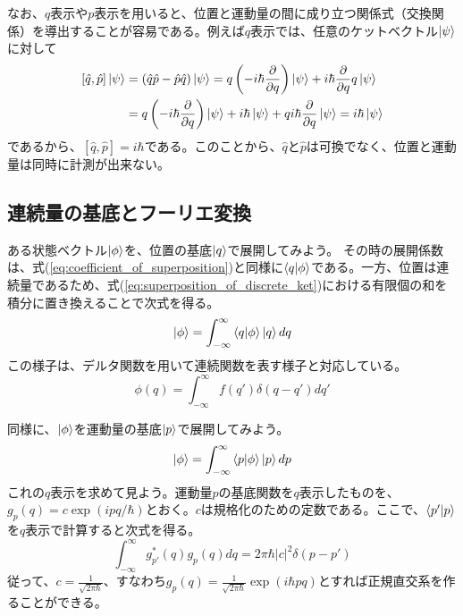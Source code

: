 なお、$q$表示や$p$表示を用いると、位置と運動量の間に成り立つ関係式（交換関係）を導出することが容易である。例えば$q$表示では、任意のケットベクトル$\ket \psi$に対して
\begin{equation}
\begin{aligned}
\left[ \hat q, \hat p \right] \ket \psi &= (\hat q \hat p - \hat p \hat q)\ket \psi = q\left( -i\hbar \frac{\partial}{\partial q} \right)\ket \psi +i\hbar \frac{\partial}{\partial q}q\ket \psi\\
  &= q\left( -i\hbar \frac{\partial}{\partial q} \right)\ket \psi +i\hbar \ket \psi + qi\hbar\frac{\partial}{\partial q} \ket \psi = i\hbar \ket \psi
\end{aligned}
\end{equation}
であるから、$[\hat q, \hat p] = i\hbar$である。このことから、$\hat q$と$\hat p$は可換でなく、位置と運動量は同時に計測が出来ない。

\subsection{連続量の基底とフーリエ変換}

ある状態ベクトル$\ket \phi$を、位置の基底$\ket q$で展開してみよう。
その時の展開係数は、式(\ref{eq:coefficient_of_superposition})と同様に$\braket{q|\phi}$である。一方、位置は連続量であるため、式(\ref{eq:superposition_of_discrete_ket})における有限個の和を積分に置き換えることで次式を得る。
\begin{equation}
  \ket \phi = \int_{-\infty}^{\infty}\braket{q|\phi}\ket q dq
\end{equation}
この様子は、デルタ関数を用いて連続関数を表す様子と対応している。
\begin{equation}
  \phi(q) = \int_{-\infty}^{\infty}f(q')\delta(q-q')dq'
\end{equation}

同様に、$\ket \phi$を運動量の基底$\ket p$で展開してみよう。
\begin{equation}
  \ket \phi = \int_{-\infty}^{\infty}\braket{p|\phi}\ket p dp
\end{equation}
これの$q$表示を求めて見よう。運動量$p$の基底関数を$q$表示したものを、$g_p(q) = c\exp(ipq/\hbar)$とおく。$c$は規格化のための定数である。ここで、$\braket {p'|p}$を$q$表示で計算すると次式を得る。
\begin{equation}
  \int_{-\infty}^\infty g_{p'}^*(q)g_p(q) dq = 2\pi\hbar|c|^2\delta(p - p')
\end{equation}
従って、$c = \frac{1}{\sqrt{2\pi\hbar}}$、すなわち$g_p(q) = \frac{1}{\sqrt{2\pi\hbar}}\exp(i\hbar pq)$とすれば正規直交系を作ることができる。

